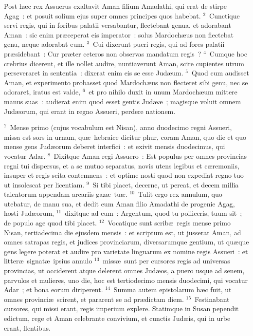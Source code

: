 \lettrine[lines=3,image=true,loversize=0.05,lraise=-0.03]{P}{}ost h\ae c rex Assuerus exaltavit Aman filium Amadathi, qui erat de stirpe Agag~: et posuit solium ejus super omnes principes quos habebat.
${}^{2}$~Cunctique servi regis, qui in foribus palatii versabantur, flectebant genua, et adorabant Aman~: sic enim pr\ae ceperat eis imperator~: solus Mardoch\ae us non flectebat genu, neque adorabat eum.
${}^{3}$~Cui dixerunt pueri regis, qui ad fores palatii pr\ae sidebant~: Cur pr\ae ter ceteros non observas mandatum regis~?
${}^{4}$~Cumque hoc crebrius dicerent, et ille nollet audire, nuntiaverunt Aman, scire cupientes utrum perseveraret in sententia~: dixerat enim eis se esse Jud\ae um.
${}^{5}$~Quod cum audisset Aman, et experimento probasset quod Mardoch\ae us non flecteret sibi genu, nec se adoraret, iratus est valde,
${}^{6}$~et pro nihilo duxit in unum Mardoch\ae um mittere manus suas~: audierat enim quod esset gentis Jud\ae \ae~; magisque voluit omnem Jud\ae orum, qui erant in regno Assueri, perdere nationem.


${}^{7}$~Mense primo (cujus vocabulum est Nisan), anno duodecimo regni Assueri, missa est sors in urnam, qu\ae\ hebraice dicitur phur, coram Aman, quo die et quo mense gens Jud\ae orum deberet interfici~: et exivit mensis duodecimus, qui vocatur Adar.
${}^{8}$~Dixitque Aman regi Assuero~: Est populus per omnes provincias regni tui dispersus, et a se mutuo separatus, novis utens legibus et c\ae remoniis, insuper et regis scita contemnens~: et optime nosti quod non expediat regno tuo ut insolescat per licentiam.
${}^{9}$~Si tibi placet, decerne, ut pereat, et decem millia talentorum appendam arcariis gaz\ae\ tu\ae .
${}^{10}$~Tulit ergo rex annulum, quo utebatur, de manu sua, et dedit eum Aman filio Amadathi de progenie Agag, hosti Jud\ae orum,
${}^{11}$~dixitque ad eum~: Argentum, quod tu polliceris, tuum sit~; de populo age quod tibi placet.
${}^{12}$~Vocatique sunt scrib\ae\ regis mense primo Nisan, tertiadecima die ejusdem mensis~: et scriptum est, ut jusserat Aman, ad omnes satrapas regis, et judices provinciarum, diversarumque gentium, ut qu\ae que gens legere poterat et audire pro varietate linguarum ex nomine regis Assueri~: et litter\ae\ signat\ae\ ipsius annulo
${}^{13}$~miss\ae\ sunt per cursores regis ad universas provincias, ut occiderent atque delerent omnes Jud\ae os, a puero usque ad senem, parvulos et mulieres, uno die, hoc est tertiodecimo mensis duodecimi, qui vocatur Adar~; et bona eorum diriperent.
${}^{14}$~Summa autem epistolarum h\ae c fuit, ut omnes provinci\ae\ scirent, et pararent se ad pr\ae dictam diem.
${}^{15}$~Festinabant cursores, qui missi erant, regis imperium explere. Statimque in Susan pependit edictum, rege et Aman celebrante convivium, et cunctis Jud\ae is, qui in urbe erant, flentibus.

